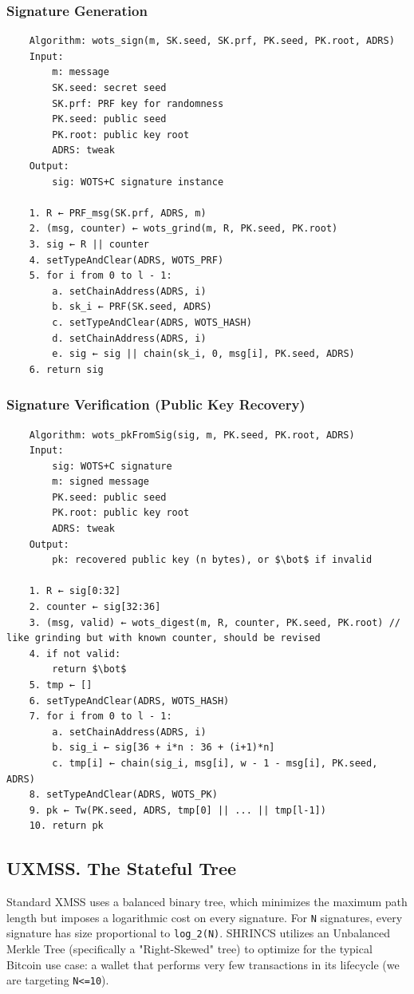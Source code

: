 \subsubsection{Signature Generation}
\begin{verbatim}
    Algorithm: wots_sign(m, SK.seed, SK.prf, PK.seed, PK.root, ADRS)
    Input:
        m: message 
        SK.seed: secret seed
        SK.prf: PRF key for randomness
        PK.seed: public seed
        PK.root: public key root
        ADRS: tweak   
    Output:
        sig: WOTS+C signature instance

    1. R ← PRF_msg(SK.prf, ADRS, m)
    2. (msg, counter) ← wots_grind(m, R, PK.seed, PK.root)
    3. sig ← R || counter
    4. setTypeAndClear(ADRS, WOTS_PRF)
    5. for i from 0 to l - 1:
        a. setChainAddress(ADRS, i)
        b. sk_i ← PRF(SK.seed, ADRS)
        c. setTypeAndClear(ADRS, WOTS_HASH)
        d. setChainAddress(ADRS, i)
        e. sig ← sig || chain(sk_i, 0, msg[i], PK.seed, ADRS)
    6. return sig
\end{verbatim}

\subsubsection{Signature Verification (Public Key Recovery)}
\begin{verbatim}
    Algorithm: wots_pkFromSig(sig, m, PK.seed, PK.root, ADRS)
    Input:
        sig: WOTS+C signature
        m: signed message
        PK.seed: public seed
        PK.root: public key root
        ADRS: tweak
    Output:
        pk: recovered public key (n bytes), or $\bot$ if invalid

    1. R ← sig[0:32]
    2. counter ← sig[32:36]
    3. (msg, valid) ← wots_digest(m, R, counter, PK.seed, PK.root) // like grinding but with known counter, should be revised
    4. if not valid:
        return $\bot$
    5. tmp ← []
    6. setTypeAndClear(ADRS, WOTS_HASH)
    7. for i from 0 to l - 1:
        a. setChainAddress(ADRS, i)
        b. sig_i ← sig[36 + i*n : 36 + (i+1)*n]
        c. tmp[i] ← chain(sig_i, msg[i], w - 1 - msg[i], PK.seed, ADRS)
    8. setTypeAndClear(ADRS, WOTS_PK)
    9. pk ← Tw(PK.seed, ADRS, tmp[0] || ... || tmp[l-1])
    10. return pk
\end{verbatim}

\subsection{UXMSS. The Stateful Tree}
Standard XMSS uses a balanced binary tree, which minimizes the maximum path length but imposes a 
logarithmic cost on every signature. For \texttt{N} signatures, every signature has size proportional to 
\texttt{log\_2(N)}. SHRINCS utilizes an Unbalanced Merkle Tree (specifically a "Right-Skewed" tree) to 
optimize for the typical Bitcoin use case: a wallet that performs very few transactions in its 
lifecycle (we are targeting \texttt{N<=10}).


